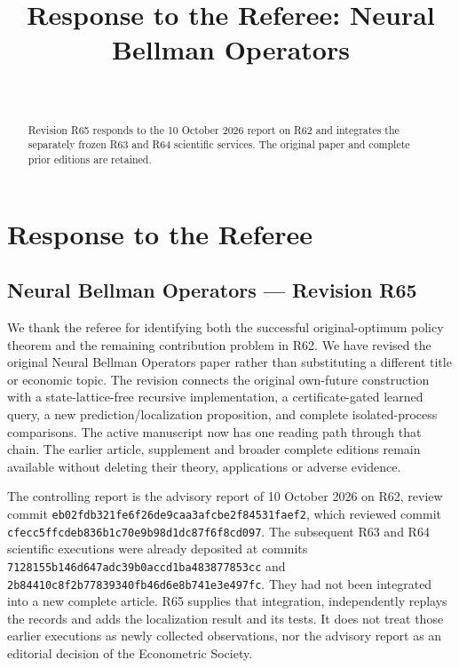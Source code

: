 \documentclass[ecta,nameyear,draft]{econsocart}
\begin{document}
\begin{frontmatter}
\title{Response to the Referee: Neural Bellman Operators}
\begin{aug}
\author[id=au1,addressref={add1}]{~}
\address[id=add1]{Peking University}
\end{aug}
\begin{abstract}Revision R65 responds to the 10 October 2026 report on R62 and integrates the separately frozen R63 and R64 scientific services. The original paper and complete prior editions are retained.\end{abstract}
\end{frontmatter}
\providecommand{\tightlist}{\setlength{\itemsep}{0pt}\setlength{\parskip}{0pt}}
\hypertarget{response-to-the-referee}{%
\section{Response to the Referee}\label{response-to-the-referee}}

\hypertarget{neural-bellman-operators-revision-r65}{%
\subsection{Neural Bellman Operators --- Revision
R65}\label{neural-bellman-operators-revision-r65}}

We thank the referee for identifying both the successful
original-optimum policy theorem and the remaining contribution problem
in R62. We have revised the original Neural Bellman Operators paper
rather than substituting a different title or economic topic. The
revision connects the original own-future construction with a
state-lattice-free recursive implementation, a certificate-gated learned
query, a new prediction/localization proposition, and complete
isolated-process comparisons. The active manuscript now has one reading
path through that chain. The earlier article, supplement and broader
complete editions remain available without deleting their theory,
applications or adverse evidence.

The controlling report is the advisory report of 10 October 2026 on R62,
review commit \nolinkurl{eb02fdb321fe6f26de9caa3afcbe2f84531faef2}, which
reviewed commit \nolinkurl{cfecc5ffcdeb836b1c70e9b98d1dc87f6f8cd097}. The
subsequent R63 and R64 scientific executions were already deposited at
commits \nolinkurl{7128155b146d647adc39b0accd1ba483877853cc} and
\nolinkurl{2b84410c8f2b77839340fb46d6e8b741e3e497fc}. They had not been
integrated into a new complete article. R65 supplies that integration,
independently replays the records and adds the localization result and
its tests. It does not treat those earlier executions as newly collected
observations, nor the advisory report as an editorial decision of the
Econometric Society.
\end{document}
